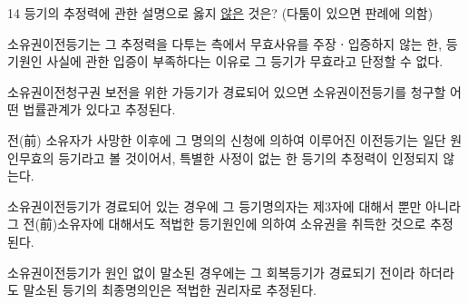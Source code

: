 \begin{question}{14}
등기의 추정력에 관한 설명으로 옳지 \uline{않은} 것은? (다툼이 있으면 판례에 의함)
\begin{choices}
  \item 소유권이전등기는 그 추정력을 다투는 측에서 무효사유를 주장ㆍ입증하지 않는 한, 등기원인 사실에 관한 입증이 부족하다는 이유로 그 등기가 무효라고 단정할 수 없다.
  \item 소유권이전청구권 보전을 위한 가등기가 경료되어 있으면 소유권이전등기를 청구할 어떤 법률관계가 있다고 추정된다.
  \item 전(前) 소유자가 사망한 이후에 그 명의의 신청에 의하여 이루어진 이전등기는 일단 원인무효의 등기라고 볼 것이어서, 특별한 사정이 없는 한 등기의 추정력이 인정되지 않는다.
  \item 소유권이전등기가 경료되어 있는 경우에 그 등기명의자는 제3자에 대해서 뿐만 아니라 그 전(前)소유자에 대해서도 적법한 등기원인에 의하여 소유권을 취득한 것으로 추정된다.
  \item 소유권이전등기가 원인 없이 말소된 경우에는 그 회복등기가 경료되기 전이라 하더라도 말소된 등기의 최종명의인은 적법한 권리자로 추정된다.
\end{choices}
\end{question}
